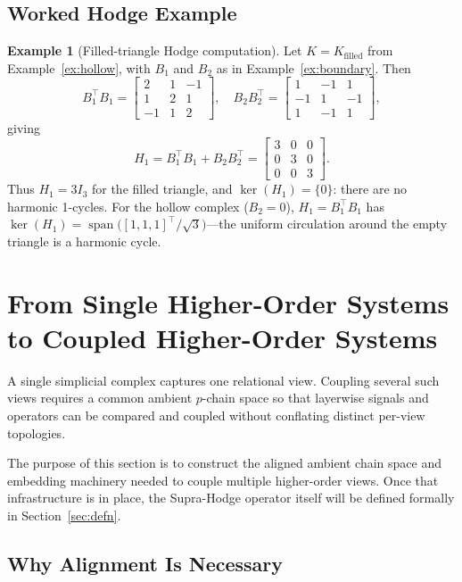 \documentclass[11pt]{article}
\theoremstyle{definition}
\newtheorem{example}[theorem]{Example}
\theoremstyle{remark}
\DeclareMathOperator{\spn}{span}
\begin{document}
\subsection{Worked Hodge Example}

\begin{example}[Filled-triangle Hodge computation]
\label{ex:hodge}
Let $K=K_{\mathrm{filled}}$ from Example~\ref{ex:hollow}, with
$B_1$ and $B_2$ as in Example~\ref{ex:boundary}. Then
\[
  B_1^\top B_1 = \begin{bmatrix}2&1&-1\\1&2&1\\-1&1&2\end{bmatrix},\quad
  B_2 B_2^\top = \begin{bmatrix}1&-1&1\\-1&1&-1\\1&-1&1\end{bmatrix},
\]
giving
\[
  H_1 = B_1^\top B_1 + B_2B_2^\top
      = \begin{bmatrix}3&0&0\\0&3&0\\0&0&3\end{bmatrix}.
\]
Thus $H_1=3I_3$ for the filled triangle, and $\ker(H_1)=\{0\}$: there are no
harmonic 1-cycles. For the hollow complex ($B_2=0$), $H_1=B_1^\top B_1$ has
$\ker(H_1) = \spn\bigl([1,1,1]^\top/\sqrt{3}\bigr)$---the uniform circulation
around the empty triangle is a harmonic cycle.
\end{example}


\section{From Single Higher-Order Systems to Coupled Higher-Order Systems}
\label{sec:coupling}

A single simplicial complex captures one relational view. Coupling several such
views requires a common ambient $p$-chain space so that layerwise signals and
operators can be compared and coupled without conflating distinct per-view
topologies.

The purpose of this section is to construct the aligned ambient chain space and
embedding machinery needed to couple multiple higher-order views. Once that
infrastructure is in place, the Supra-Hodge operator itself will be defined
formally in Section~\ref{sec:defn}.

\subsection{Why Alignment Is Necessary}
\end{document}
